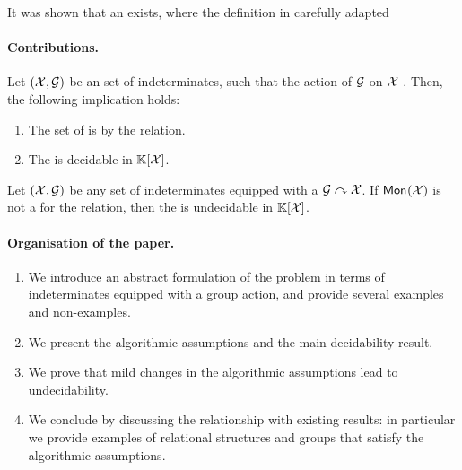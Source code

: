 It was shown that an 
exists, where the definition in carefully adapted 

\paragraph{Contributions.}

\begin{theorem}
    \label{thm:decid-equiv-idl}
    Let $(\mathcal{X}, \mathcal{G})$ be an  set of indeterminates, such that the 
    action of $\mathcal{G}$ on $\mathcal{X}$ .
    Then, the following implication holds:
    \begin{enumerate}
        \item \label{item:mono-wqo-om1}
            The set of 
            is  by 
            the  relation.
        \item \label{item:decid-equiv-idl}
            The  is decidable in $\mathbb{K}[\mathcal{X}]$.
    \end{enumerate}
\end{theorem}

\begin{conjecture}
    \label{lem:undecid-equiv-idl}
    Let $(\mathcal{X}, \mathcal{G})$ be any 
    set of indeterminates equipped with a  $\mathcal{G} \curvearrowright \mathcal{X}$. If 
    $\mathsf{Mon}_{}(\mathcal{X})$ is not a 
    for the  relation, then the  is undecidable in $\mathbb{K}[\mathcal{X}]$.
\end{conjecture}


\paragraph{Organisation of the paper.}
\begin{enumerate}
    \item We introduce an abstract formulation of the problem 
        in terms of indeterminates equipped with a group action, and
        provide several examples and non-examples.
    \item We present the algorithmic assumptions and the main decidability
        result.
    \item We prove that mild changes in the algorithmic assumptions
        lead to undecidability.
    \item We conclude by discussing the relationship with existing
        results: in particular we provide examples of relational
        structures and groups that satisfy the algorithmic assumptions.
\end{enumerate}

